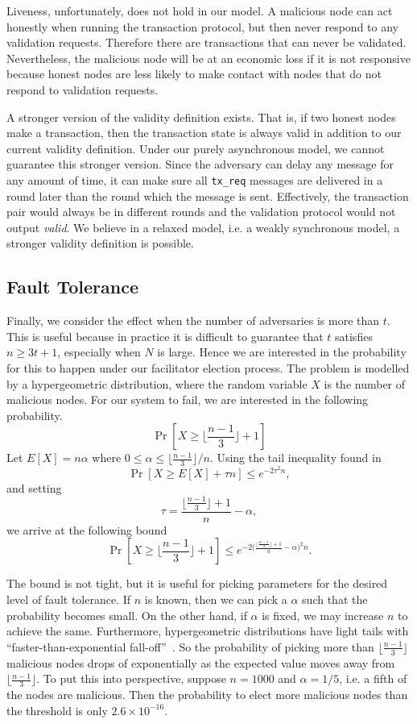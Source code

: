 Liveness, unfortunately, does not hold in our model.
A malicious node can act honestly when running the transaction protocol,
but then never respond to any validation requests.
Therefore there are transactions that can never be validated.
Nevertheless, the malicious node will be at an economic loss if it is not responsive because honest nodes are less likely to make contact with nodes that do not respond to validation requests.

A stronger version of the validity definition exists.
That is, if two honest nodes make a transaction,
then the transaction state is always valid in addition to our current validity definition.
Under our purely asynchronous model, we cannot guarantee this stronger version.
Since the adversary can delay any message for any amount of time,
it can make sure all \texttt{tx\_req} messages are delivered in a round later than the round which the message is sent.
Effectively, the transaction pair would always be in different rounds and the validation protocol would not output \emph{valid}.
We believe in a relaxed model, i.e. a weakly synchronous model, a stronger validity definition is possible.

\subsection{Fault Tolerance}
Finally, we consider the effect when the number of adversaries is more than $t$.
This is useful because in practice it is difficult to guarantee that $t$ satisfies $n \ge 3t + 1$,
especially when $N$ is large.
Hence we are interested in the probability for this to happen under our facilitator election process.
The problem is modelled by a hypergeometric distribution,
where the random variable $X$ is the number of malicious nodes.
For our system to fail, we are interested in the following probability.
$$
\Pr[X \ge \lfloor \frac{n-1}{3} \rfloor + 1]
$$
Let $E[X] = n\alpha$ where $0 \le \alpha \le \lfloor \frac{n-1}{3} \rfloor/n$.
Using the tail inequality found in~\cite{skala2013hypergeometric}
$$
\Pr[X \ge E[X] + \tau n] \le e^{-2\tau^2n},
$$
and setting 
$$
\tau = \frac{\lfloor \frac{n-1}{3} \rfloor + 1}{n} - \alpha,
$$
we arrive at the following bound
$$
\Pr[X \ge \lfloor \frac{n-1}{3} \rfloor + 1] \le e^{-2 \big(\frac{\lfloor  \frac{n - 1}{3} \rfloor + 1}{n} - \alpha \big)^2 n}.
$$

The bound is not tight, but it is useful for picking parameters for the desired level of fault tolerance.
If $n$ is known, then we can pick a $\alpha$ such that the probability becomes small.
On the other hand, if $\alpha$ is fixed, we may increase $n$ to achieve the same.
Furthermore, hypergeometric distributions have light tails with ``faster-than-exponential fall-off''~\cite{skala2013hypergeometric}.
So the probability of picking more than $\lfloor \frac{n-1}{3} \rfloor$ malicious nodes drops of exponentially as the expected value moves away from $\lfloor \frac{n-1}{3} \rfloor$.
To put this into perspective,
suppose $n = 1000$ and $\alpha = 1/5$, i.e. a fifth of the nodes are malicious.
Then the probability to elect more malicious nodes than the threshold is only $2.6 \times 10^{-16}$.



